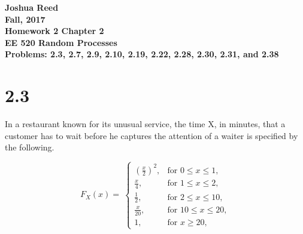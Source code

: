 \documentclass[12pt]{article}
\newcommand{\mysection}[1]{\section*{#1}}
\begin{document}
{\large \bfseries %
  Joshua Reed\\
  Fall, 2017 \\
  \centering
  {\huge Homework 2 Chapter 2}\\
  EE 520 Random Processes \\
  Problems: 2.3, 2.7, 2.9, 2.10, 2.19, 2.22, 2.28, 2.30, 2.31, and 2.38}
 
 
\mysection{2.3} 
In a restaurant known for its unusual service, the time X, in minutes, that a customer has to wait
before he captures the attention of a waiter is specified by the following.


\begin{equation*}
  F_X(x)=\
    \begin{cases}
      {(\frac{x}{2})}^2, & \text{for }0\leq x \leq1,\\
      \frac{x}{4}, & \text{for }1\leq x \leq2,\\
      \frac{1}{2}, & \text{for }2\leq x \leq10,\\
      \frac{x}{20}, & \text{for }10\leq x \leq20,\\
      1, & \text{for }x\geq 20,
    \end{cases}
\end{equation*}
\end{document}
